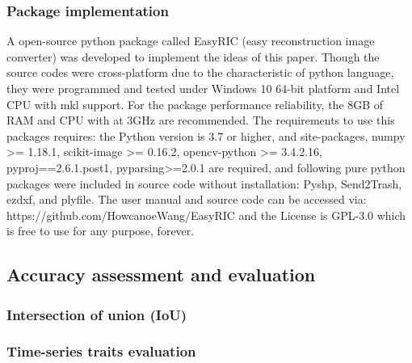 \documentclass{configs/bmcart}
\begin{document}
\subsubsection*{Package implementation}
A open-source python \cite{guido_python_2020} package called EasyRIC (easy reconstruction image converter) was developed to implement the ideas of this paper. Though the source codes were cross-platform due to the characteristic of python language, they were programmed and tested under Windows 10 64-bit platform and Intel CPU with \acrfull*{mkl} support. For the package performance reliability, the 8GB of RAM and CPU with at 3GHz are recommended. The requirements to use this packages requires: the Python version is 3.7 or higher, and site-packages, numpy >= 1.18.1, scikit-image >= 0.16.2, opencv-python >= 3.4.2.16, pyproj==2.6.1.post1, pyparsing>=2.0.1 are required, and following pure python packages were included in source code without installation: Pyshp, Send2Trash, ezdxf, and plyfile. The user manual and source code can be accessed via: https://github.com/HowcanoeWang/EasyRIC and the License is GPL-3.0 which is free to use for any purpose, forever.

\subsection*{Accuracy assessment and evaluation}
\subsubsection*{Intersection of union (IoU)}

\subsubsection*{Time-series traits evaluation}


\renewcommand*{\glsgroupskip}{}
\printglossary[type=\acronymtype, title=List of abbreviations]

\end{document}
